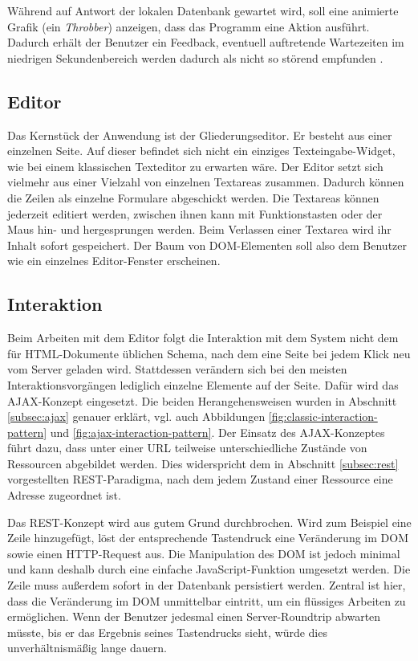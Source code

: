 Während auf Antwort der lokalen Datenbank gewartet wird, soll eine animierte Grafik (ein \textit{Throbber}) anzeigen, dass das Programm eine Aktion ausführt. Dadurch erhält der Benutzer ein Feedback, eventuell auftretende Wartezeiten im niedrigen Sekundenbereich werden dadurch als nicht so störend empfunden .


\subsection{Editor}

Das Kernstück der Anwendung ist der Gliederungseditor. Er besteht aus einer einzelnen Seite. Auf dieser befindet sich nicht ein einziges Texteingabe-Widget, wie bei einem klassischen Texteditor zu erwarten wäre. Der Editor setzt sich vielmehr aus einer Vielzahl von einzelnen Textareas zusammen. Dadurch können die Zeilen als einzelne Formulare abgeschickt werden. Die Textareas können jederzeit editiert werden, zwischen ihnen kann mit Funktionstasten oder der Maus hin- und hergesprungen werden. Beim Verlassen einer Textarea wird ihr Inhalt sofort gespeichert. Der Baum von DOM-Elementen soll also dem Benutzer wie ein einzelnes Editor-Fenster erscheinen.


\subsection{Interaktion}

Beim Arbeiten mit dem Editor folgt die Interaktion mit dem System nicht dem für HTML-Dokumente üblichen Schema, nach dem eine Seite bei jedem Klick neu vom Server geladen wird. Stattdessen verändern sich bei den meisten Interaktionsvorgängen lediglich einzelne Elemente auf der Seite. Dafür wird das AJAX-Konzept eingesetzt. Die beiden Herangehensweisen wurden in Abschnitt \ref{subsec:ajax} genauer erklärt, vgl. auch Abbildungen \ref{fig:classic-interaction-pattern} und \ref{fig:ajax-interaction-pattern}. Der Einsatz des AJAX-Konzeptes führt dazu, dass unter einer URL teilweise unterschiedliche Zustände von Ressourcen abgebildet werden. Dies widerspricht dem in Abschnitt \ref{subsec:rest} vorgestellten REST-Paradigma, nach dem jedem Zustand einer Ressource eine Adresse zugeordnet ist. 

Das REST-Konzept wird aus gutem Grund durchbrochen. Wird zum Beispiel eine Zeile hinzugefügt, löst der entsprechende Tastendruck eine Veränderung im DOM sowie einen HTTP-Request aus. Die Manipulation des DOM ist jedoch minimal und kann deshalb durch eine einfache JavaScript-Funktion umgesetzt werden. Die Zeile muss außerdem sofort in der Datenbank persistiert werden. Zentral ist hier, dass die Veränderung im DOM unmittelbar eintritt, um ein flüssiges Arbeiten zu ermöglichen. Wenn der Benutzer jedesmal einen Server-Roundtrip abwarten müsste, bis er das Ergebnis seines Tastendrucks sieht, würde dies unverhältnismäßig lange dauern. 



